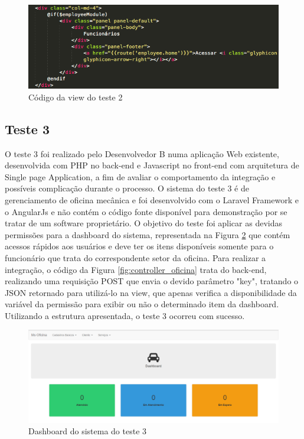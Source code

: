 \begin{figure}
	\includegraphics[width=1\textwidth]{images/view_laravel.png}
	\caption{Código da view do teste 2}
    \label{fig:view_laravel}
\end{figure}


\subsection{Teste 3}


O teste 3 foi realizado pelo Desenvolvedor B numa aplicação Web existente, desenvolvida com PHP no back-end e Javascript no front-end com arquitetura de Single page Application, a fim de avaliar o comportamento da integração e possíveis complicação durante o processo. O sistema do teste 3 é de gerenciamento de oficina mecânica e foi desenvolvido com o Laravel Framework e o AngularJs e não contém o código fonte disponível para demonstração por se tratar de um software proprietário. O objetivo do teste foi aplicar as devidas permissões para a dashboard do sistema, representada na Figura \ref{fig:dashboard_oficina} que contém acessos rápidos aos usuários e deve ter os itens disponíveis somente para o funcionário que trata do correspondente setor da oficina. Para realizar a integração, o código da Figura \ref{fig:controller_oficina} trata do back-end, realizando uma requisição POST que envia o devido parâmetro "key", tratando o JSON retornado para utilizá-lo na view, que apenas verifica a disponibilidade da variável da permissão para exibir ou não o determinado item da dashboard. Utilizando a estrutura apresentada, o teste 3 ocorreu com sucesso.


\begin{figure}
	\includegraphics[width=1\textwidth]{images/dash_oficina.png}
	\caption{Dashboard do sistema do teste 3}
    \label{fig:dashboard_oficina}
\end{figure}

